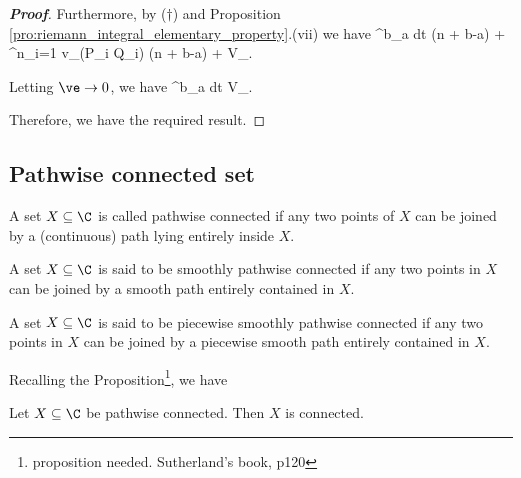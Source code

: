 \begin{proof}[\bf Proof]
Furthermore, by ($\dag$) and Proposition \ref{pro:riemann_integral_elementary_property}.(vii) we have
\be
\int^b_a dt \leq \ve(n + b-a) + \sum^n_{i=1} v_\gamma(P_i \cup Q_i) \leq \ve(n + b-a) + V_\gamma[a,b].
\ee

Letting $\ve\to 0$, we have
\be
\int^b_a dt \leq V_\gamma[a,b].
\ee

Therefore, we have the required result.
\end{proof}





\subsection{Pathwise connected set}

\begin{definition}\label{def:pathwise_connected_set_complex_space}
A set $X\subseteq \C$ is called pathwise connected if any two points of $X$ can be joined by a (continuous) path lying entirely inside $X$.
\end{definition}

\begin{definition}
A set $X\subseteq \C$ is said to be smoothly pathwise connected if any two points in $X$ can be joined by a smooth path entirely contained in $X$.
\end{definition}

\begin{definition}
A set $X\subseteq \C$ is said to be piecewise smoothly pathwise connected if any two points in $X$ can be joined by a piecewise smooth path entirely contained in $X$.
\end{definition}



Recalling the Proposition\footnote{proposition needed. Sutherland's book, p120}, we have

\begin{proposition}\label{pro:pathwise_connected_implies_connected_complex}
Let $X\subseteq \C$ be pathwise connected. Then $X$ is connected.
\end{proposition}


%

